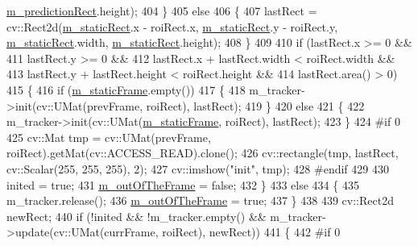 \begin{DoxyCode}
      \mbox{\hyperlink{class_c_track_aeab9c3c95a6d988918f5874a8910b90b}{m\_predictionRect}}.height);
404                 \}
405                 \textcolor{keywordflow}{else}
406                 \{
407                     lastRect = cv::Rect2d(\mbox{\hyperlink{class_c_track_abbec66a84ee65ce5d6390565698e5156}{m\_staticRect}}.x - roiRect.x, 
      \mbox{\hyperlink{class_c_track_abbec66a84ee65ce5d6390565698e5156}{m\_staticRect}}.y - roiRect.y, \mbox{\hyperlink{class_c_track_abbec66a84ee65ce5d6390565698e5156}{m\_staticRect}}.width, 
      \mbox{\hyperlink{class_c_track_abbec66a84ee65ce5d6390565698e5156}{m\_staticRect}}.height);
408                 \}
409 
410                 \textcolor{keywordflow}{if} (lastRect.x >= 0 &&
411                     lastRect.y >= 0 &&
412                     lastRect.x + lastRect.width < roiRect.width &&
413                     lastRect.y + lastRect.height < roiRect.height &&
414                     lastRect.area() > 0)
415                 \{
416                     \textcolor{keywordflow}{if} (\mbox{\hyperlink{class_c_track_a87bfcad44f8da34b2411733ed5ddcbae}{m\_staticFrame}}.empty())
417                     \{
418                         m\_tracker->init(cv::UMat(prevFrame, roiRect), lastRect);
419                     \}
420                     \textcolor{keywordflow}{else}
421                     \{
422                         m\_tracker->init(cv::UMat(\mbox{\hyperlink{class_c_track_a87bfcad44f8da34b2411733ed5ddcbae}{m\_staticFrame}}, roiRect), lastRect);
423                     \}
424 \textcolor{preprocessor}{#if 0}
425                     cv::Mat tmp = cv::UMat(prevFrame, roiRect).getMat(cv::ACCESS\_READ).clone();
426                     cv::rectangle(tmp, lastRect, cv::Scalar(255, 255, 255), 2);
427                     cv::imshow(\textcolor{stringliteral}{"init"}, tmp);
428 \textcolor{preprocessor}{#endif}
429 
430                     inited = \textcolor{keyword}{true};
431                     \mbox{\hyperlink{class_c_track_ad97c3e53969dbb60e7690c4f2d038172}{m\_outOfTheFrame}} = \textcolor{keyword}{false};
432                 \}
433                 \textcolor{keywordflow}{else}
434                 \{
435                     m\_tracker.release();
436                     \mbox{\hyperlink{class_c_track_ad97c3e53969dbb60e7690c4f2d038172}{m\_outOfTheFrame}} = \textcolor{keyword}{true};
437                 \}
438 
439                 cv::Rect2d newRect;
440                 \textcolor{keywordflow}{if} (!inited && !m\_tracker.empty() && m\_tracker->update(cv::UMat(currFrame, roiRect), 
      newRect))
441                 \{
442 \textcolor{preprocessor}{#if 0}

\end{DoxyCode}
